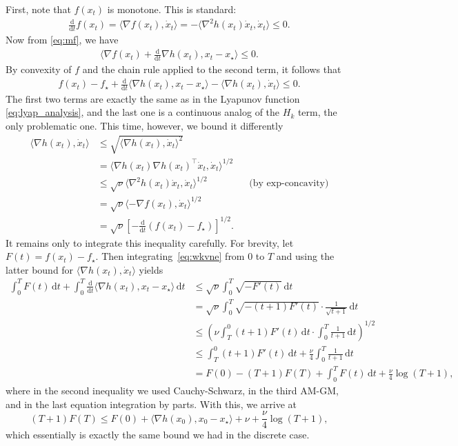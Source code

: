 \documentclass[a4paper]{article}
\renewcommand{\leq}{\leqslant}
\newcommand{\ip}[2]{\langle #1, #2\rangle}
\newcommand{\drv}{\frac{\mathrm{d}}{\mathrm{d}t}}
\newcommand{\dotx}{\dot{x}}
\newcommand{\dt}{\,\mathrm{d}t}
\begin{document}
First, note that $f(x_t)$ is monotone. This is standard:
\begin{align*}
  \drv{f(x_t)} = \ip{\nabla f(x_t)}{\dotx_t} = -\ip{\nabla^2h(x_t) \dotx_t}{ \dotx_t}\leq 0.
\end{align*}
Now from \eqref{eq:mf}, we have
\begin{align*}
  \ip{\nabla f(x_t) + \drv{\nabla h(x_t)}}{ x_t - x_\star} \leq 0.
\end{align*}
By convexity of $f$ and the chain rule applied to the second term, it follows that
\begin{align}\label{eq:wkvne}
 f(x_t) - f_\star  + \drv \ip{\nabla h(x_t)}{ x_t - x_\star} - \ip{\nabla h(x_t)}{ \dotx_t} \leq 0.
\end{align}
The first two terms are exactly the same as in the Lyapunov function \eqref{eq:lyap_analysis}, and the last one is a continuous analog of the $H_k$ term, the only problematic one. This time, however, we bound it differently
\begin{align*}
  \ip{\nabla h(x_t)}{ \dotx_t} &\leq \sqrt{\ip{\nabla h(x_t)}{ \dotx_t}^2} \\
                              &= \ip{\nabla h(x_t)\nabla h(x_t)^\top \dotx_t}{ \dotx_t}^{1/2} \\
                              &\leq \sqrt {\nu} \ip{\nabla^2 h(x_t)\dotx_t}{ \dotx_t}^{1/2} & &\text{(by exp-concavity)}\\
                               &= \sqrt{\nu}\ip{-\nabla f(x_t)}{ \dotx_t}^{1/2} \\
                               &= \sqrt{\nu}\left[-\drv(f(x_t)-f_\star)\right]^{1/2}
                               .
\end{align*}
It remains only to integrate this inequality carefully. 
For brevity, let $F(t) = f(x_t)-f_\star$. Then integrating~\eqref{eq:wkvne} from $0$ to $T$ and using the latter bound for
$\ip{\nabla h(x_t)}{ \dotx_t}$ yields
\begin{align*}
  \int_0^T F(t)\dt  + \int_0^T\drv \ip{\nabla h(x_t)}{ x_t - x_\star}\dt &\leq \sqrt{\nu}\int_0^T\sqrt{-F'(t)}\dt \\
                                                                        &= \sqrt{\nu}\int_0^T\sqrt{-(t+1)F'(t)} \cdot \frac{1}{\sqrt{t+1}}\dt \\
                                                                        &\leq \left(\nu \int_T^0(t+1)F'(t) \dt \cdot \int_0^T\frac{1}{t+1}\dt\right)^{1/2} \\
                                                                        &\leq \int_T^0(t+1)F'(t) \dt + \frac{\nu}{4}\int_0^T\frac{1}{t+1}\dt \\
                                                                        &= F(0) -  (T+1)F(T) + \int_0^T F(t)\dt + \frac{\nu}{4} \log (T+1),
\end{align*}
where in the second inequality we used Cauchy-Schwarz, in the third AM-GM,
and in the last equation integration by parts.
With this, we arrive at
\[(T+1)F(T)\leq F(0) + \ip{\nabla h(x_0)}{x_0 - x_\star} + \nu +\frac{\nu}{4} \log(T+1),\]
which essentially is exactly the same bound we had in the discrete case.
\end{document}
